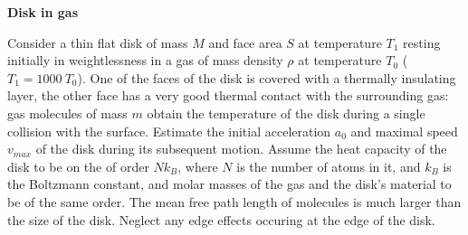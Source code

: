 {\Large\textbf{Disk in gas}}

Consider a thin flat disk of mass $M$ and face area $S$ at temperature $T_1$
resting initially in weightlessness in a gas of mass density $\rho$ at
temperature $T_0$ ($T_1 = 1000\ T_0$). One of the faces of the disk is covered
with a thermally insulating layer, the other face has a very good thermal
contact with the surrounding gas: gas molecules of mass $m$ obtain the
temperature of the disk during a single collision with the surface. Estimate
the initial acceleration $a_0$ and maximal speed $v_{max}$ of the disk during
its subsequent motion. Assume the heat capacity of the disk to be on the of
order $Nk_B$, where $N$ is the number of atoms in it, and $k_B$ is the
Boltzmann constant, and molar masses of the gas and the disk's material to be
of the same order. The mean free path length of molecules is much larger than
the size of the disk. Neglect any edge effects occuring at the edge of the
disk.
